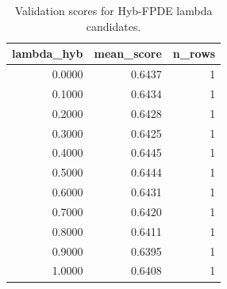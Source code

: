 \begin{table}[t]
\caption{Validation scores for Hyb-FPDE lambda candidates.}
\label{tab:lambda_distribution_computed}
\centering
\begin{tabular}{rrr}
\toprule
lambda\_hyb & mean\_score & n\_rows \\
\midrule
0.0000 & 0.6437 & 1 \\
0.1000 & 0.6434 & 1 \\
0.2000 & 0.6428 & 1 \\
0.3000 & 0.6425 & 1 \\
0.4000 & 0.6445 & 1 \\
0.5000 & 0.6444 & 1 \\
0.6000 & 0.6431 & 1 \\
0.7000 & 0.6420 & 1 \\
0.8000 & 0.6411 & 1 \\
0.9000 & 0.6395 & 1 \\
1.0000 & 0.6408 & 1 \\
\bottomrule
\end{tabular}

\end{table}
